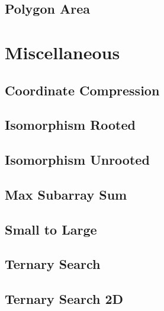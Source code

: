\subsection{Polygon Area}
\raggedbottom
\hrulefill

\section{Miscellaneous}
\subsection{Coordinate Compression}
\raggedbottom
\hrulefill
\subsection{Isomorphism Rooted}
\raggedbottom
\hrulefill
\subsection{Isomorphism Unrooted}
\raggedbottom
\hrulefill
\subsection{Max Subarray Sum}
\raggedbottom
\hrulefill
\subsection{Small to Large}
\raggedbottom
\hrulefill
\subsection{Ternary Search}
\raggedbottom
\hrulefill
\subsection{Ternary Search 2D}
\raggedbottom
\hrulefill